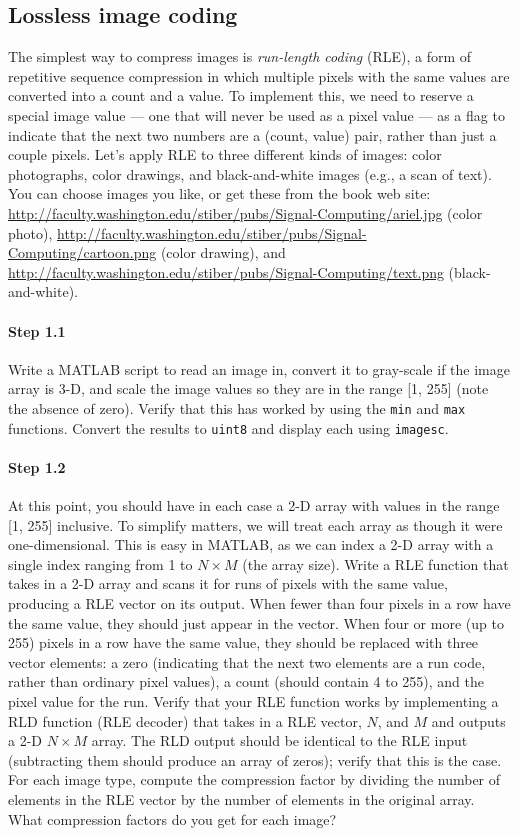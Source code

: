 \subsection{Lossless image coding}

The simplest way to compress images is \emph{run-length coding} (RLE),
a form of repetitive sequence compression in which multiple pixels
with the same values are converted into a count and a value. To
implement this, we need to reserve a special image value --- one that
will never be used as a pixel value --- as a flag to indicate that the
next two numbers are a (count, value) pair, rather than just a couple
pixels. Let's apply RLE to three different kinds of images: color
photographs, color drawings, and black-and-white images (e.g., a scan
of text). You can choose images you like, or get these from the book
web site:
\url{http://faculty.washington.edu/stiber/pubs/Signal-Computing/ariel.jpg}
(color photo),
\url{http://faculty.washington.edu/stiber/pubs/Signal-Computing/cartoon.png}
(color drawing), and
\url{http://faculty.washington.edu/stiber/pubs/Signal-Computing/text.png}
(black-and-white).

\paragraph{Step 1.1} Write a MATLAB script to read an image in,
convert it to gray-scale if the image array is 3-D, and scale the
image values so they are in the range [1, 255] (note the absence of
zero).  Verify that this has worked by using the \verb|min| and
\verb|max| functions. Convert the results to \verb|uint8| and
display each using \verb|imagesc|.

\paragraph{Step 1.2} At this point, you should have in each case a 2-D
array with values in the range [1, 255] inclusive. To simplify
matters, we will treat each array as though it were
one-dimensional. This is easy in MATLAB, as we can index a 2-D array
with a single index ranging from 1 to $N \times M$ (the array
size). Write a RLE function that takes in a 2-D array and scans it for
runs of pixels with the same value, producing a RLE vector on its
output. When fewer than four pixels in a row have the same value, they
should just appear in the vector. When four or more (up to 255) pixels
in a row have the same value, they should be replaced with three
vector elements: a zero (indicating that the next two elements are a
run code, rather than ordinary pixel values), a count (should contain
4 to 255), and the pixel value for the run. Verify that your RLE
function works by implementing a RLD function (RLE decoder) that takes
in a RLE vector, $N$, and $M$ and outputs a 2-D $N \times M$
array. The RLD output should be identical to the RLE input
(subtracting them should produce an array of zeros); verify that this
is the case. For each image type, compute the compression factor by
dividing the number of elements in the RLE vector by the number of
elements in the original array. What compression factors do you get
for each image?

